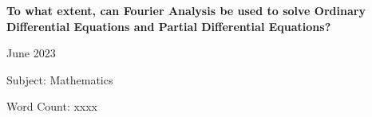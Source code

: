 \begin{titlepage}
    \begin{center}
        \null
        \vfill
            
        \Large
        \textbf{To what extent, can Fourier Analysis be used to solve Ordinary Differential Equations and Partial Differential Equations?}
            
        \vspace{0.5cm}
        
        \large
        
        June 2023

        \vspace{2cm}

        Subject: Mathematics

        Word Count: xxxx
        
        \vfill
    \end{center}
\end{titlepage}
